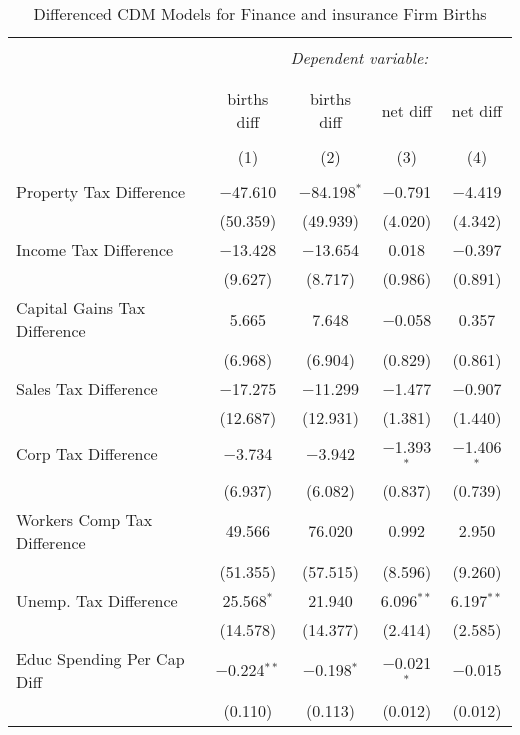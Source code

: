
\begin{table}[!htbp] \centering 
  \caption{Differenced CDM Models for  Finance and insurance Firm Births} 
  \label{} 
\begin{tabular}{@{\extracolsep{5pt}}lcccc} 
\\[-1.8ex]\hline 
\hline \\[-1.8ex] 
 & \multicolumn{4}{c}{\textit{Dependent variable:}} \\ 
\cline{2-5} 
\\[-1.8ex] & \multicolumn{4}{c}{ } \\ 
 & births diff & births diff & net diff & net diff \\ 
\\[-1.8ex] & (1) & (2) & (3) & (4)\\ 
\hline \\[-1.8ex] 
 Property Tax Difference & $-$47.610 & $-$84.198$^{*}$ & $-$0.791 & $-$4.419 \\ 
  & (50.359) & (49.939) & (4.020) & (4.342) \\ 
  Income Tax Difference & $-$13.428 & $-$13.654 & 0.018 & $-$0.397 \\ 
  & (9.627) & (8.717) & (0.986) & (0.891) \\ 
  Capital Gains Tax Difference & 5.665 & 7.648 & $-$0.058 & 0.357 \\ 
  & (6.968) & (6.904) & (0.829) & (0.861) \\ 
  Sales Tax Difference & $-$17.275 & $-$11.299 & $-$1.477 & $-$0.907 \\ 
  & (12.687) & (12.931) & (1.381) & (1.440) \\ 
  Corp Tax Difference & $-$3.734 & $-$3.942 & $-$1.393$^{*}$ & $-$1.406$^{*}$ \\ 
  & (6.937) & (6.082) & (0.837) & (0.739) \\ 
  Workers Comp Tax Difference & 49.566 & 76.020 & 0.992 & 2.950 \\ 
  & (51.355) & (57.515) & (8.596) & (9.260) \\ 
  Unemp. Tax Difference & 25.568$^{*}$ & 21.940 & 6.096$^{**}$ & 6.197$^{**}$ \\ 
  & (14.578) & (14.377) & (2.414) & (2.585) \\ 
  Educ Spending Per Cap Diff & $-$0.224$^{**}$ & $-$0.198$^{*}$ & $-$0.021$^{*}$ & $-$0.015 \\ 
  & (0.110) & (0.113) & (0.012) & (0.012) \\ 

\end{tabular}
\end{table}
